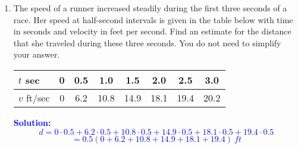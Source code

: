 \documentclass[letterpaper,11pt]{article}
\newcommand{\sol}[2]{\begin{minipage}[c][#1]{\linewidth}{\textcolor{blue}{\textbf{Solution:}}\quad \textcolor{blue}{#2}}\end{minipage}}
\newcommand{\sol}[2]{\begin{minipage}[c][#1]{\linewidth}{\vfill}\end{minipage}}
\begin{document}
\begin{enumerate}
\item The speed of a runner increased steadily during the first three seconds of a race. Her speed at half-second intervals is given in the table below with time in seconds and velocity in feet per second. Find an estimate for the distance that she traveled during these three seconds. You do not need to simplify your answer.
\begin{center}
    \begin{tabular}{|l|c|c|c|c|c|c|c|}
        \hline
        $t$ sec & 0 & 0.5 & 1.0 & 1.5 & 2.0 & 2.5 & 3.0 \\
        \hline
        $v$ ft/sec & 0 & 6.2 & 10.8 & 14.9 & 18.1 & 19.4 & 20.2\\
        \hline
    \end{tabular}
\end{center}
\sol{1in}{
\[d = 0 \cdot 0.5 + 6.2 \cdot 0.5 + 10.8 \cdot 0.5 + 14.9 \cdot 0.5 + 18.1 \cdot 0.5 + 19.4 \cdot 0.5\]
\[ = 0.5 ( 0 + 6.2 + 10.8 + 14.9 + 18.1 + 19.4) \ ft\]
}
\end{enumerate}
\end{document}
